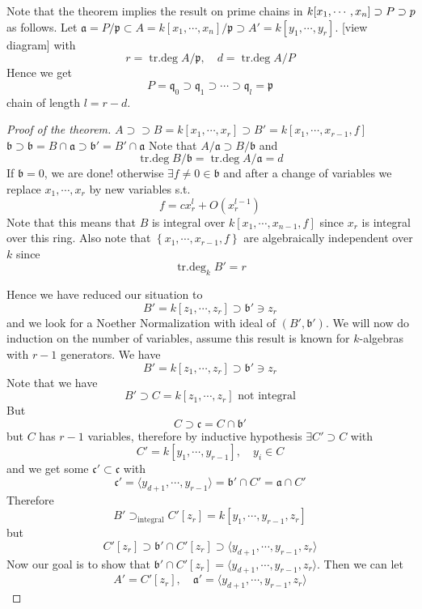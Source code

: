 \documentclass[11pt,a4paper]{article}
\theoremstyle{definition}
\theoremstyle{plain}
\theoremstyle{remark}
\renewcommand{\set}[1]{\left\{ #1 \right\}}
\newcommand{\angles}[1]{\langle #1 \rangle}
\begin{document}
Note that the theorem implies the result on prime chains in $k[x_1, \cdots, x_n] \supset P \supset \mathrlap{p}$ as follows. 
Let $\mathfrak{a} = P/\mathfrak{p} \subset A = k[x_1, \cdots, x_n] / \mathfrak{p} \supset A' = k[y_1, \cdots, y_r]$. 
[view diagram]
with 
$$r = \operatorname{tr.deg} A/\mathfrak{p}, \quad d = \operatorname{tr.deg} A/P$$
Hence we get 
$$P = \mathfrak{q}_0 \supset \mathfrak{q}_1 \supset \cdots \supset \mathfrak{q}_l = \mathfrak{p}$$
chain of length $l = r-d$. 

\begin{proof}[Proof of the theorem]
    $A \supset \supset B = k[x_1, \cdots, x_r] \supset B' = k[x_1, \cdots, x_{r-1}, f]$
    $\mathfrak{b} \supset \mathfrak{b} = B \cap \mathfrak{a} \supset \mathfrak{b}' = B' \cap \mathfrak{a}$
    Note that $A/\mathfrak{a} \supset B/\mathfrak{b}$ and 
    $$\operatorname{tr.deg} B /\mathfrak{b} = \operatorname{tr.deg} A/\mathfrak{a} = d$$
    If $\mathfrak{b} = 0$, we are done! otherwise $\exists f \ne 0 \in \mathfrak{b}$ and after a 
    change of variables we replace $x_1, \cdots, x_r$ by new variables s.t. 
    $$f = c x_r^l + O(x_r^{l-1})$$
    Note that this means that $B$ is integral over $k[x_1, \cdots, x_{n-1}, f]$ since $x_r$ is integral over this ring. 
    Also note that $\set{x_1, \cdots, x_{r-1}, f}$ are algebraically independent over $k$ since 
    $$\operatorname{tr.deg}_k B' = r$$

    Hence we have reduced our situation to 
    $$B'= k[z_1, \cdots, z_r] \supset \mathfrak{b}' \ni z_r$$
    and we look for a Noether Normalization with ideal of $(B', \mathfrak{b}')$. 
    We will now do induction on the number of variables, assume this result is known for $k$-algebras 
    with $r-1$ generators. We have 
    $$B' = k[z_1, \cdots, z_r] \supset \mathfrak{b}' \ni z_r$$
    Note that we have 
    $$B' \supset C = k[z_1, \cdots, z_r] \text{ not integral}$$
    But 
    $$C \supset \mathfrak{c} = C \cap \mathfrak{b}'$$
    but $C$ has $r-1$ variables, therefore by inductive hypothesis $\exists C' \supset C$ with 
    $$C' = k[y_1, \cdots, y_{r-1}], \quad y_i \in C $$
    and we get some $\mathfrak{c}' \subset \mathfrak{c}$ with 
    $$\mathfrak{c}' = \angles{y_{d+1}, \cdots, y_{r-1}} = \mathfrak{b}' \cap C' = \mathfrak{a} \cap C'$$
    Therefore 
    $$B' \supset_{\text{integral}} C'[z_r] = k[y_1, \cdots, y_{r-1}, z_r]$$
    but 
    $$C'[z_r] \supset \mathfrak{b}' \cap C'[z_r] \supset \angles{y_{d+1}, \cdots, y_{r-1}, z_r}$$
    Now our goal is to show that $\mathfrak{b}' \cap C'[z_r] = \angles{y_{d+1}, \cdots, y_{r-1}, z_r}$. 
    Then we can let 
    $$A' = C'[z_r], \quad \mathfrak{a}' = \angles{y_{d+1}, \cdots, y_{r-1}, z_r}$$


\end{proof}
\end{document}
